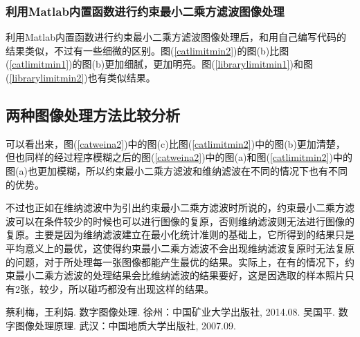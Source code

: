 \documentclass[UTF8]{ctexart}
\begin{document}
    \subsubsection{利用Matlab内置函数进行约束最小二乘方滤波图像处理}
    利用Matlab内置函数进行约束最小二乘方滤波图像处理后，和用自己编写代码的结果类似，不过有一些细微的区别。图(\ref{catlimitmin2})的图(b)比图(\ref{catlimitmin1})的图(b)更加细腻，更加明亮。图(\ref{librarylimitmin1})和图(\ref{librarylimitmin2})也有类似结果。
    \subsection{两种图像处理方法比较分析}
    可以看出来，图(\ref{catweina2})中的图(c)比图(\ref{catlimitmin2})中的图(b)更加清楚，但也同样的经过程序模糊之后的图(\ref{catweina2})中的图(a)和图(\ref{catlimitmin2})中的图(a)也更加模糊，所以约束最小二乘方滤波和维纳滤波在不同的情况下也有不同的优势。

    不过也正如在维纳滤波中为引出约束最小二乘方滤波时所说的，约束最小二乘方滤波可以在条件较少的时候也可以进行图像的复原，否则维纳滤波则无法进行图像的复原。主要是因为维纳滤波建立在最小化统计准则的基础上，它所得到的结果只是平均意义上的最优，这使得约束最小二乘方滤波不会出现维纳滤波复原时无法复原的问题，对于所处理每一张图像都能产生最优的结果。实际上，在有的情况下，约束最小二乘方滤波的处理结果会比维纳滤波的结果要好，这是因选取的样本照片只有2张，较少，所以碰巧都没有出现这样的结果。

    \begin{thebibliography}{1}
         蔡利梅，王利娟. 数字图像处理. 徐州：中国矿业大学出版社, 2014.08.
         吴国平. 数字图像处理原理. 武汉：中国地质大学出版社, 2007.09.
    \end{thebibliography}
\end{document}
